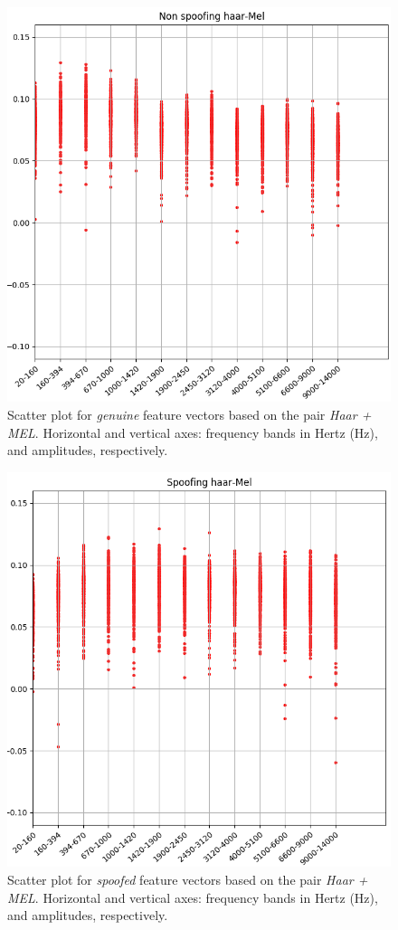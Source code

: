 		\begin{figure}[H]
			\centering
			\includegraphics[scale=.53]{images/results/barkVersusMel/liveHaarMel}
			\caption{Scatter plot for \textit{genuine} feature vectors based on the pair \textit{Haar + MEL}. Horizontal and vertical axes: frequency bands in Hertz (Hz), and amplitudes, respectively.}
			\label{fig:livehaarmel}
		\end{figure}
		\begin{figure}[H]
			\centering
			\includegraphics[scale=.53]{images/results/barkVersusMel/spoofingHaarMel}
			\caption{Scatter plot for \textit{spoofed} feature vectors based on the pair \textit{Haar + MEL}. Horizontal and vertical axes: frequency bands in Hertz (Hz), and amplitudes, respectively.}
			\label{fig:spoofinghaarmel}
		\end{figure}
